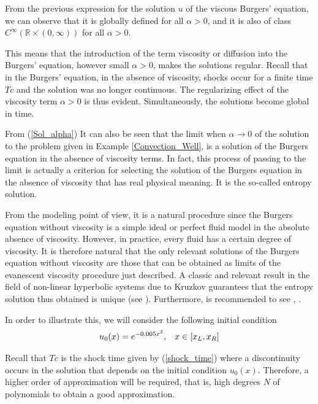 	From the previous expression for the solution $u$ of the viscous Burgers' equation, we can observe that it is globally defined for all $\alpha > 0$, and it is also of class $C^{\infty} (\mathbb{R} \times (0, \infty))$ for all $\alpha > 0$.
	
	This means that the introduction of the term viscosity or diffusion into the Burgers' equation, however small $\alpha > 0$, makes the solutions regular. Recall that in the Burgers' equation, in the absence of viscosity, shocks occur for a finite time $Tc$ and the solution was no longer continuous. The regularizing effect of the viscosity term $\alpha > 0$ is thus evident. Simultaneously, the solutions become global in time. 
	
	From (\ref{Sol_alpha}) It can also be seen that the limit when $\alpha \rightarrow 0$ of the solution to the problem given in Example \ref{Convection_Well}, is a solution of the Burgers equation in the absence of viscosity terms. In fact, this process of passing to the limit is actually a criterion for selecting the solution of the Burgers equation in the absence of viscosity that has real physical meaning. It is the so-called entropy solution. 
	
	From the modeling point of view, it is a natural procedure since the Burgers equation without viscosity is a simple ideal or perfect fluid model in the absolute absence of viscosity. However, in practice, every fluid has a certain degree of viscosity. It is therefore natural that the only relevant solutions of the Burgers equation without viscosity are those that can be obtained as limits of the evanescent viscosity procedure just described. A classic and relevant result in the field of non-linear hyperbolic systems due to Kruzkov guarantees that the entropy solution thus obtained is unique (see \cite{Kruzkov1970}). Furthermore, is recommended to see \cite{Tadmor1989}, \cite{Maday1989}. %
	
	In order to illustrate this, we will consider the following initial condition
	\begin{align*}
		u_0 (x) = e^{-0.005 x^2}, \hspace{3mm} x \in [x_L, x_R] 
	\end{align*}
	
	Recall that $Tc$ is the shock time given by (\ref{shock_time}) where a discontinuity occurs in the solution that depends on the initial condition $u_0 (x)$. Therefore, a higher order of approximation will be required, that is, high degrees $N$ of polynomials to obtain a good approximation. 
	
